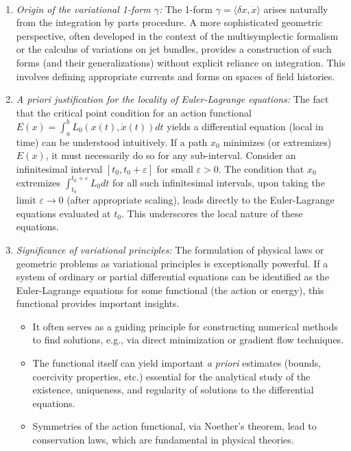 \begin{remark}
\label{rem:further_aspects}
\,
\begin{enumerate}
    \item \textit{Origin of the variational 1-form $\gamma$:} The 1-form $\gamma = \langle \delta x, \dot{x} \rangle$ arises naturally from the integration by parts procedure. A more sophisticated geometric perspective, often developed in the context of the multisymplectic formalism or the calculus of variations on jet bundles, provides a construction of such forms (and their generalizations) without explicit reliance on integration. This involves defining appropriate currents and forms on spaces of field histories.

    \item \textit{A priori justification for the locality of Euler-Lagrange equations:} The fact that the critical point condition for an action functional $E(x) = \int_a^b L_0(x(t), \dot{x}(t)) dt$ yields a differential equation (local in time) can be understood intuitively. If a path $x_0$ minimizes (or extremizes) $E(x)$, it must necessarily do so for any sub-interval. Consider an infinitesimal interval $[t_0, t_0 + \varepsilon]$ for small $\varepsilon > 0$. The condition that $x_0$ extremizes $\int_{t_0}^{t_0+\varepsilon} L_0 dt$ for all such infinitesimal intervals, upon taking the limit $\varepsilon \to 0$ (after appropriate scaling), leads directly to the Euler-Lagrange equations evaluated at $t_0$. This underscores the local nature of these equations.

    \item \textit{Significance of variational principles:} The formulation of physical laws or geometric problems as variational principles is exceptionally powerful. If a system of ordinary or partial differential equations can be identified as the Euler-Lagrange equations for some functional (the action or energy), this functional provides important insights.
    \begin{itemize}
        \item It often serves as a guiding principle for constructing numerical methods to find solutions, e.g., via direct minimization or gradient flow techniques.
        \item The functional itself can yield important \textit{a priori} estimates (bounds, coercivity properties, etc.) essential for the analytical study of the existence, uniqueness, and regularity of solutions to the differential equations.
        \item Symmetries of the action functional, via Noether's theorem, lead to conservation laws, which are fundamental in physical theories.
    \end{itemize}
\end{enumerate}
\end{remark}


